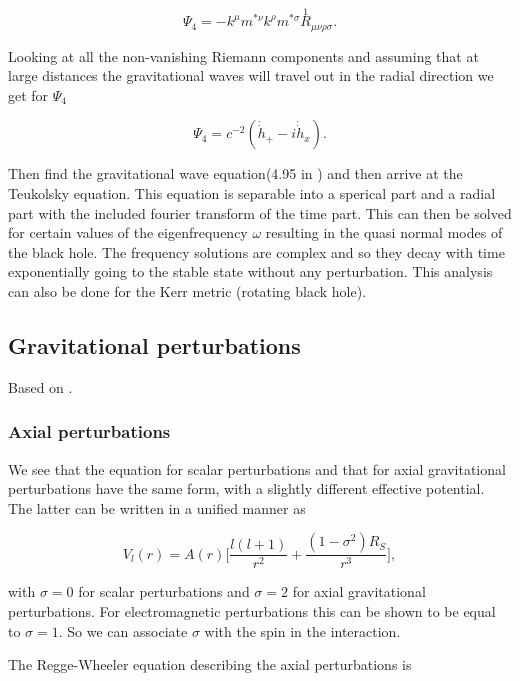 \documentclass[12 pt]{article}
\begin{document}
\begin{equation}
	\Psi_4 = -k^{\mu} m^{*\nu} k^{\rho} m^{*\sigma} \stackrel{1}{R}_{\mu \nu \rho \sigma}.
\end{equation}

Looking at all the non-vanishing Riemann components and assuming that at large distances the gravitational waves will travel out in the radial direction we get for $ \Psi_4$

\begin{equation}
	\Psi_4 = c^{-2} ( \Dot{\Dot{h}}_{+} - i\Dot{\Dot{h}}_{x}) .
\end{equation}

Then find the gravitational wave equation(4.95 in \cite{creighton}) and then arrive at the Teukolsky equation. This equation is separable into a sperical part and a radial part with the included fourier transform of the time part. This can then be solved for certain values of the eigenfrequency $\omega$ resulting in the quasi normal modes of the black hole. The frequency solutions are complex and so they decay with time exponentially going to the stable state without any perturbation. This analysis can also be done for the Kerr metric (rotating black hole). 

\subsection{Gravitational perturbations}
Based on \cite{maggiore}.

\subsubsection{Axial perturbations}
We see that the equation for scalar perturbations and that for axial
gravitational perturbations have the same form, with a slightly different
effective potential. The latter can be written in a unified manner as

\begin{equation}
	V_l(r) = A(r) \big[\frac{l(l+1)}{r^2} + \frac{(1-\sigma^2)R_S}{r^3} \big],
\end{equation}

with $\sigma = 0$ for scalar perturbations and $\sigma = 2 $ for axial gravitational perturbations. For electromagnetic perturbations this can be shown to be equal to $\sigma = 1$. So we can associate $\sigma$ with the spin in the interaction. 

The Regge-Wheeler equation describing the axial perturbations is
\end{document}
